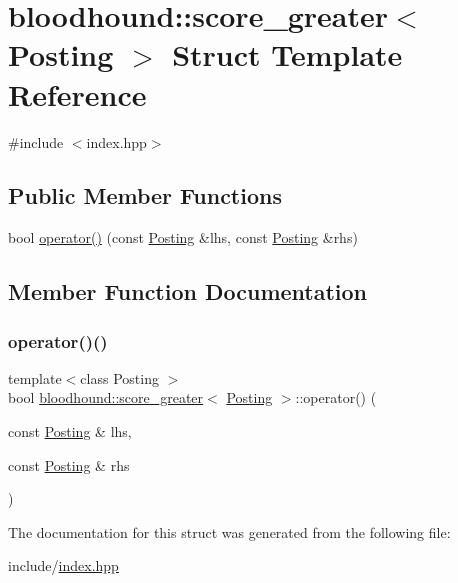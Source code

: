\hypertarget{structbloodhound_1_1score__greater}{}\section{bloodhound\+:\+:score\+\_\+greater$<$ Posting $>$ Struct Template Reference}
\label{structbloodhound_1_1score__greater}


{\ttfamily \#include $<$index.\+hpp$>$}

\subsection*{Public Member Functions}
\begin{DoxyCompactItemize}
\item 
bool \mbox{\hyperlink{structbloodhound_1_1score__greater_a56a430279ebf5d6b2526335fe3b2d668}{operator()}} (const \mbox{\hyperlink{structbloodhound_1_1Posting}{Posting}} \&lhs, const \mbox{\hyperlink{structbloodhound_1_1Posting}{Posting}} \&rhs)
\end{DoxyCompactItemize}


\subsection{Member Function Documentation}
\mbox{\label{structbloodhound_1_1score__greater_a56a430279ebf5d6b2526335fe3b2d668}} 
\subsubsection{\texorpdfstring{operator()()}{operator()()}}
{\footnotesize\ttfamily template$<$class Posting $>$ \\
bool \mbox{\hyperlink{structbloodhound_1_1score__greater}{bloodhound\+::score\+\_\+greater}}$<$ \mbox{\hyperlink{structbloodhound_1_1Posting}{Posting}} $>$\+::operator() (\begin{DoxyParamCaption}\item[{const \mbox{\hyperlink{structbloodhound_1_1Posting}{Posting}} \&}]{lhs,  }\item[{const \mbox{\hyperlink{structbloodhound_1_1Posting}{Posting}} \&}]{rhs }\end{DoxyParamCaption})\hspace{0.3cm}{\ttfamily [inline]}}



The documentation for this struct was generated from the following file\+:\begin{DoxyCompactItemize}
\item 
include/\mbox{\hyperlink{index_8hpp}{index.\+hpp}}\end{DoxyCompactItemize}
